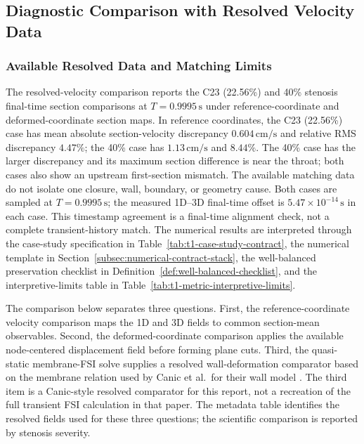 \subsection{Diagnostic Comparison with Resolved Velocity Data}
\label{sec:resolved-3d-comparison}

\subsubsection{Available Resolved Data and Matching Limits}
\label{subsec:preliminary-cross-model-velocity-comparison}

The resolved-velocity comparison reports the C23 (22.56\%) and 40\% stenosis
final-time section comparisons at $T=0.9995\,\mathrm{s}$ under
reference-coordinate and deformed-coordinate section maps. In reference
coordinates, the C23 (22.56\%) case has
mean absolute section-velocity discrepancy
$0.604\,\mathrm{cm}/\mathrm{s}$ and relative RMS discrepancy $4.47\%$; the
40\% case has $1.13\,\mathrm{cm}/\mathrm{s}$ and $8.44\%$. The 40\% case has
the larger discrepancy and its maximum section difference is near the throat;
both cases also show an upstream first-section mismatch. The available matching
data do not isolate one closure, wall, boundary, or geometry cause. Both cases
are sampled at $T=0.9995\,\mathrm{s}$; the measured 1D--3D final-time offset is
$5.47\times10^{-14}\,\mathrm{s}$ in each case. This timestamp agreement is a
final-time alignment check, not a complete transient-history match. The
numerical results are interpreted through the case-study specification in
Table~\ref{tab:t1-case-study-contract}, the numerical template in
Section~\ref{subsec:numerical-contract-stack}, the
well-balanced preservation checklist in Definition~\ref{def:well-balanced-checklist},
and the interpretive-limits table in
Table~\ref{tab:t1-metric-interpretive-limits}.

The comparison below separates three questions. First, the
reference-coordinate velocity comparison maps the 1D and 3D fields to common
section-mean observables. Second, the deformed-coordinate comparison applies the
available node-centered displacement field before forming plane cuts. Third,
the quasi-static membrane-FSI solve supplies a resolved wall-deformation
comparator based on the membrane relation used by Canic et al.\ for their wall
model \cite[Eq.~(35)]{CanicEtAl2024Extended1DStenosis}. The third item is a
Canic-style resolved comparator for this report, not a recreation of the full
transient FSI calculation in that paper. The metadata table identifies the
resolved fields used for these three questions; the scientific comparison is
reported by stenosis severity.

